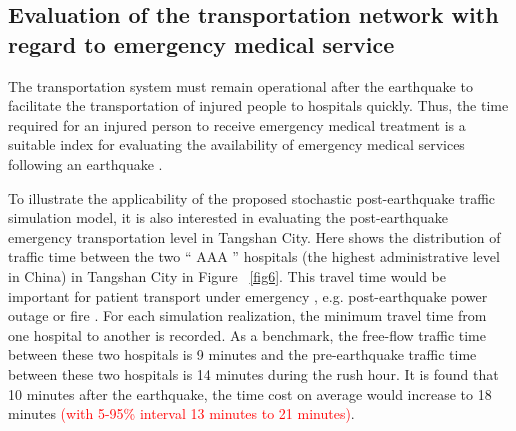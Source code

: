 \documentclass[review,11pt,nonatbib]{elsarticle}
\begin{document}
\subsection{Evaluation of the transportation network with regard to emergency medical service}
\par The transportation system must remain operational after the earthquake to facilitate the transportation of injured people to hospitals quickly. Thus, the time required for an injured person to receive emergency medical treatment is a suitable index for evaluating the availability of emergency medical services following an earthquake \citep{jones1995emergency,djalali2011facilitators}. 

To illustrate the applicability of the proposed stochastic post-earthquake traffic simulation model, it is also interested in evaluating the post-earthquake emergency transportation level in Tangshan City. Here shows the distribution of traffic time between the two `` AAA '' hospitals (the highest administrative level in China) in Tangshan City in Figure ~\ref{fig6}. This travel time would be important for patient transport under emergency \citep{ceferino2020effective}, e.g. post-earthquake power outage or fire . For each simulation realization, the minimum travel time from one hospital to another is recorded. As a benchmark, the free-flow traffic time between these two hospitals is 9 minutes and the pre-earthquake traffic time between these two hospitals is 14 minutes during the rush hour. It is found that 10 minutes after the earthquake, the time cost on average would increase to 18 minutes \textcolor{red}{(with 5-95\% interval 13 minutes to 21 minutes)}. 
\end{document}
